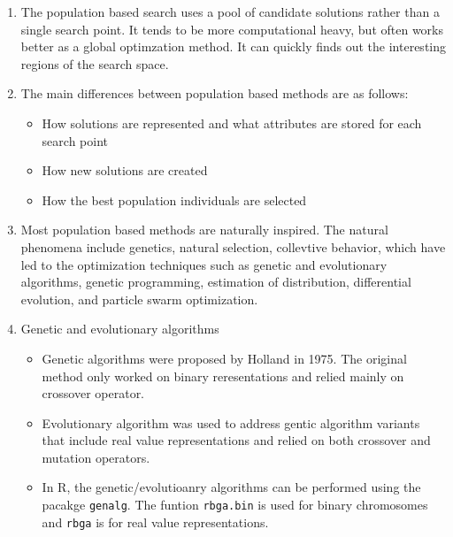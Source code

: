 \documentclass[12pt, a4paper]{article}
\begin{document}
\begin{enumerate}

 \item The population based search uses a pool of candidate solutions rather than a single search point. It tends to be more computational heavy, but often works better as a global optimzation method. It can quickly finds out the interesting regions of the search space.
 
 \item The main differences between population based methods are as follows:
  \begin{itemize}
   \item How solutions are represented and what attributes are stored for each search point
   \item How new solutions are created
   \item How the best population individuals are selected
  \end{itemize}
  
 \item Most population based methods are naturally inspired. The natural phenomena include genetics, natural selection, collevtive behavior, which have led to the optimization techniques such as genetic and evolutionary algorithms, genetic programming, estimation of distribution, differential evolution, and particle swarm optimization.
 
 \item Genetic and evolutionary algorithms
  \begin{itemize}
   \item Genetic algorithms were proposed by Holland in 1975. The original method only worked on binary reresentations and relied mainly on crossover operator. 
   \item Evolutionary algorithm was used to address gentic algorithm variants that include real value representations and relied on both crossover and mutation operators.
   \item In R, the genetic/evolutioanry algorithms can be performed using the pacakge \texttt{genalg}. The funtion \texttt{rbga.bin} is used for binary chromosomes and \texttt{rbga} is for real value representations. 
  \end{itemize}
 

\end{enumerate}
\end{document}
